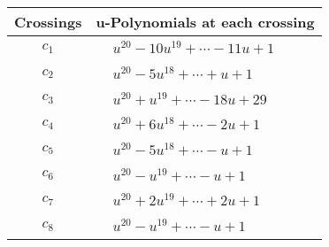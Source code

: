 \documentclass[1p]{elsarticle_modified}
\theoremstyle{definition}
\begin{document}
\begin{tabular}{m{50pt}|m{274pt}}
Crossings & \hspace{64pt}u-Polynomials at each crossing \\
\hline $$\begin{aligned}c_{1}\end{aligned}$$&$\begin{aligned}
&u^{20}-10 u^{19}+\cdots-11 u+1
\end{aligned}$\\
\hline $$\begin{aligned}c_{2}\end{aligned}$$&$\begin{aligned}
&u^{20}-5 u^{18}+\cdots+u+1
\end{aligned}$\\
\hline $$\begin{aligned}c_{3}\end{aligned}$$&$\begin{aligned}
&u^{20}+u^{19}+\cdots-18 u+29
\end{aligned}$\\
\hline $$\begin{aligned}c_{4}\end{aligned}$$&$\begin{aligned}
&u^{20}+6 u^{18}+\cdots-2 u+1
\end{aligned}$\\
\hline $$\begin{aligned}c_{5}\end{aligned}$$&$\begin{aligned}
&u^{20}-5 u^{18}+\cdots- u+1
\end{aligned}$\\
\hline $$\begin{aligned}c_{6}\end{aligned}$$&$\begin{aligned}
&u^{20}- u^{19}+\cdots- u+1
\end{aligned}$\\
\hline $$\begin{aligned}c_{7}\end{aligned}$$&$\begin{aligned}
&u^{20}+2 u^{19}+\cdots+2 u+1
\end{aligned}$\\
\hline $$\begin{aligned}c_{8}\end{aligned}$$&$\begin{aligned}
&u^{20}- u^{19}+\cdots- u+1
\end{aligned}$\\

\end{tabular}
\end{document}

